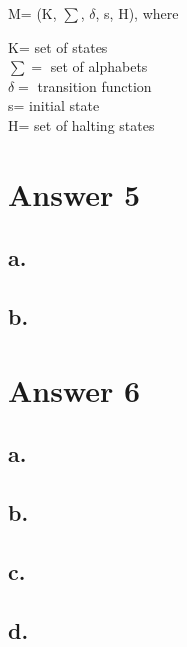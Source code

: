 \documentclass[12pt]{article}
\begin{document}
M= (K, $\sum$, $\delta$, s, H), where
\begin{center}
    K= set of states\\
    $\sum =$ set of alphabets\\
    $\delta=$ transition function\\
    s= initial state\\
    H= set of halting states
\end{center}


\section*{Answer 5}

\subsection*{a.}

\subsection*{b.}



\section*{Answer 6}

\subsection*{a.}

\subsection*{b.}

\subsection*{c.}

\subsection*{d.}


\end{document}
